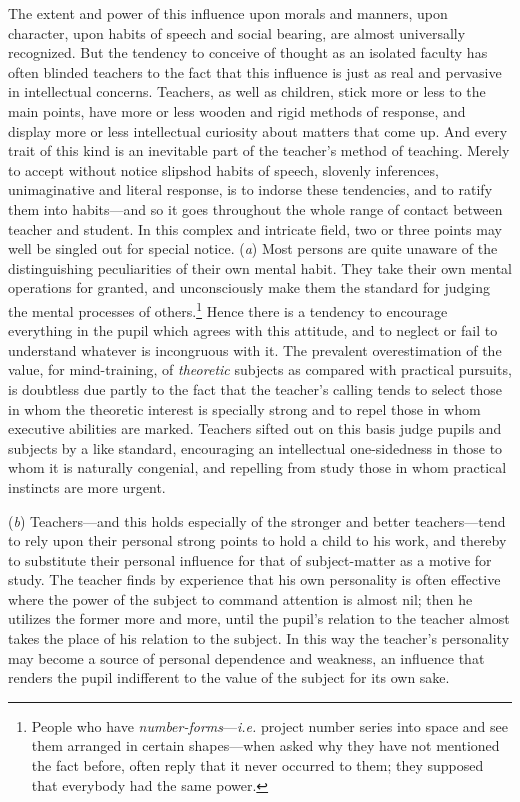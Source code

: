 \documentclass[showtrims,ustradepaper]{memoir}
\begin{document}
The extent and power of this influence upon morals and manners, upon
character, upon habits of speech and social bearing, are almost
universally recognized. But the tendency to conceive of thought as an
isolated faculty has often blinded teachers to the fact that this
influence is just as real and pervasive in intellectual concerns.
Teachers, as well as children, stick more or less to the main points,
have more or less wooden and rigid methods of response, and display more
or less intellectual curiosity about matters that come up. And every
trait of this kind is an inevitable part of the teacher's method of
teaching. Merely to accept without notice slipshod habits of speech,
slovenly inferences, unimaginative and literal response, is to indorse
these tendencies, and to ratify them into habits---and so it goes
throughout the whole range of contact between teacher and student. In
this complex and intricate field, two or three points may well be
singled out for special notice. (\emph{a}) Most persons are quite
unaware of the distinguishing peculiarities of their own mental habit.
They take their own mental operations for granted, and unconsciously
make them the standard for judging the mental processes of
others.\footnote{
People who have \emph{number-forms}---\emph{i.e.} project number series
into space and see them arranged in certain shapes---when asked why they
have not mentioned the fact before, often reply that it never occurred
to them; they supposed that everybody had the same power.
}
Hence
there
is a tendency to encourage everything in the pupil which agrees with
this attitude, and to neglect or fail to understand whatever is
incongruous with it. The prevalent overestimation of the value, for
mind-training, of \emph{theoretic} subjects as compared with practical
pursuits, is doubtless due partly to the fact that the teacher's calling
tends to select those in whom the theoretic interest is specially strong
and to repel those in whom executive abilities are marked. Teachers
sifted out on this basis judge pupils and subjects by a like standard,
encouraging an intellectual one-sidedness in those to whom it is
naturally congenial, and repelling from study those in whom practical
instincts are more urgent.


(\emph{b}) Teachers---and this holds especially of the stronger and
better teachers---tend to rely upon their personal strong points to hold
a child to his work, and thereby to substitute their personal influence
for that of subject-matter as a motive for study. The teacher finds by
experience that his own personality is often effective where the power
of the subject to command attention is almost nil; then he utilizes the
former more and more, until the pupil's relation to the teacher almost
takes the place of his relation to the subject. In this way the
teacher's personality may become a source of personal dependence and
weakness, an influence that renders the pupil indifferent to the value
of the subject for its own sake.
\end{document}
